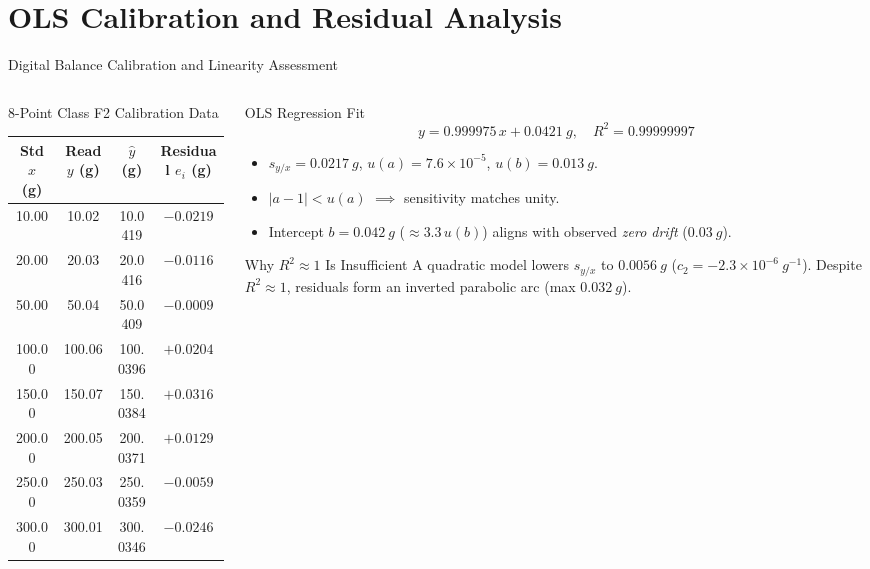 \documentclass[aspectratio=169,10pt]{beamer}
\newcommand{\sm}{\fontsize{8.2}{10.2}\selectfont}
\newcommand{\xs}{\fontsize{7.1}{9}\selectfont}
\begin{document}
\section{OLS Calibration and Residual Analysis}

\begin{frame}{Digital Balance Calibration and Linearity Assessment}
\begin{columns}[T,onlytextwidth]
\begin{column}{.48\textwidth}
\begin{block}{8-Point Class F2 Calibration Data}\xs
\centering
\begin{tabular}{@{}cccc@{}}
\toprule
\textbf{Std $x$ (g)} & \textbf{Read $y$ (g)} & $\hat{y}$ \textbf{(g)} & \textbf{Residual $e_i$ (g)}\\
\midrule
10.00 & 10.02 & 10.0419 & $-0.0219$\\
20.00 & 20.03 & 20.0416 & $-0.0116$\\
50.00 & 50.04 & 50.0409 & $-0.0009$\\
100.00 & 100.06 & 100.0396 & $+0.0204$\\
150.00 & 150.07 & 150.0384 & $+0.0316$\\
200.00 & 200.05 & 200.0371 & $+0.0129$\\
250.00 & 250.03 & 250.0359 & $-0.0059$\\
300.00 & 300.01 & 300.0346 & $-0.0246$\\
\bottomrule
\end{tabular}
\end{block}
\end{column}

\begin{column}{.50\textwidth}
\begin{exampleblock}{OLS Regression Fit}\sm
$$\boxed{y = 0.999975\,x + 0.0421\ \si{g}, \quad R^2 = 0.99999997}$$
\begin{itemize}
\item $s_{y/x} = \SI{0.0217}{g}$, $u(a)=7.6\times 10^{-5}$, $u(b)=\SI{0.013}{g}$.
\item $|a-1| < u(a)$ $\implies$ sensitivity matches unity.
\item Intercept $b = \SI{0.042}{g}$ ($\approx 3.3\,u(b)$) aligns with observed \textit{zero drift} ($\SI{0.03}{g}$).
\end{itemize}
\end{exampleblock}
\begin{alertblock}{Why $R^2 \approx 1$ Is Insufficient}\xs
A quadratic model lowers $s_{y/x}$ to $\SI{0.0056}{g}$ ($c_2 = -2.3\times 10^{-6}\ \si{g^{-1}}$). Despite $R^2 \approx 1$, residuals form an inverted parabolic arc (max $\SI{0.032}{g}$).
\end{alertblock}
\end{column}
\end{columns}
\end{frame}
\end{document}
